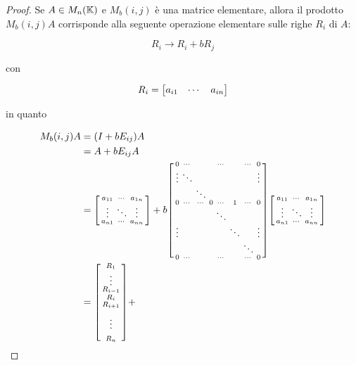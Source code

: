 \begin{proof}
	Se $ A \in M_{n}(\mathbb{K}) $ e $ M_{b}(i,j) $ è una matrice elementare, allora il prodotto $ M_{b}(i,j) A $ corrisponde alla seguente operazione elementare sulle righe $ R_{i} $ di $ A $:
	
	\begin{equation}
		R_{i} \to R_{i} + b R_{j}
	\end{equation}

	con
	
	\begin{equation}
		R_{i} = \bmqty{ a_{i1} & \cdots & a_{in} }
	\end{equation}

	in quanto
	
	\begin{align}
		\begin{split}
			M_{b}(i,j) A &= (I + b E_{ij}) A \\
			&= A + b E_{ij} A \\
			&= \sbmqty{ %
						a_{11} & \cdots & a_{1n} \\
						\vdots & \ddots & \vdots \\
						a_{n1} & \cdots & a_{nn} %
						} + %
				b \sbmqty{ %
							0 & \cdots & & & \cdots & & \cdots & 0 \\
							\vdots & \ddots & & & & & & \vdots \\
							& & \ddots & & & & & \\
							0 & \cdots & \cdots & 0 & \cdots & 1 & \cdots & 0 \\
							& & & & \ddots & & & \\
							\vdots & & & & & \ddots & & \vdots \\
							& & & & & & \ddots & \\
							0 & \cdots & & & \cdots & & \cdots & 0 %
							} %
				\sbmqty{ %
						a_{11} & \cdots & a_{1n} \\
						\vdots & \ddots & \vdots \\
						a_{n1} & \cdots & a_{nn} %
						} \\
			&= \sbmqty{ %
						R_{1} \\
						\vdots \\
						R_{i-1} \\
						R_{i} \\
						R_{i+1} \\
						\\
						\vdots \\
						\\
						R_{n} %
						} + %

\end{split}
\end{align}
\end{proof}
